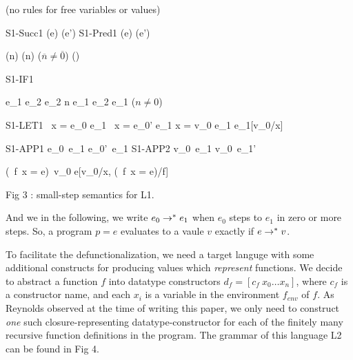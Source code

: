 \begin{center}
          (no rules for free variables or values)

                {S1-Succ1}  {(e) \TO {}(e')}
  \quad {}
                {S1-Pred1}  {(e) \TO {}(e')}

  \quad {}  {(\overline n) \TO {}}
  \quad {}  {(\overline n) \TO
                            }{\scriptsize($\overline n \neq \overline 0$)}
  \quad {}  {() \TO {}}

                {S1-IF1}    { \TO {}}

            {   e_1  e_2
                             \TO   e_2
                            }
  \quad {}    { \overline n  e_1  e_2
                             \TO   e_1
                            }{\scriptsize($n \neq 0$)}

                {S1-LET1}  {\ x = e_0   e_1 \TO
                            \ x = e_0'  e_1}
           {  x = v_0   e_1 \TO e_1[v_0/x]}

                {S1-APP1}  {e_0\ e_1 \TO e_0'\ e_1}
  \quad {}
                {S1-APP2}  {v_0\ e_1 \TO v_0\ e_1'}

          {(\ f\ x = e)\ v_0
                            \TO e[v_0/x, (\ f\ x = e)/f]}


\vspace {.5cm}            Fig 3 : small-step semantics for L1.
\end{center}

And we in the following, we write $e_0 \rightarrow^{*} e_1$ when $e_0$ steps to $e_1$ in zero
or more steps. So, a program $p = e$ evaluates to a vaule $v$ exactly if $e \rightarrow^{*} v$.

To facilitate the defunctionalization,
we need a target languge with some additional constructs for producing values which
{\it represent} functions.
We decide to abstract a function $f$ into datatype constructors
$d_f = [c_f\ x_0 \dots x_n]$,
where $c_f$ is a constructor name, and each $x_i$ is a variable
in the environment $f_{env}$ of $f$.
As Reynolds observed at the time of writing this paper\cite{Reynolds1968},
we only need to construct {\it one} such closure-representing datatype-constructor
for each of the finitely many recursive function definitions in the program.
The grammar of this language L2 can be found in Fig 4.

